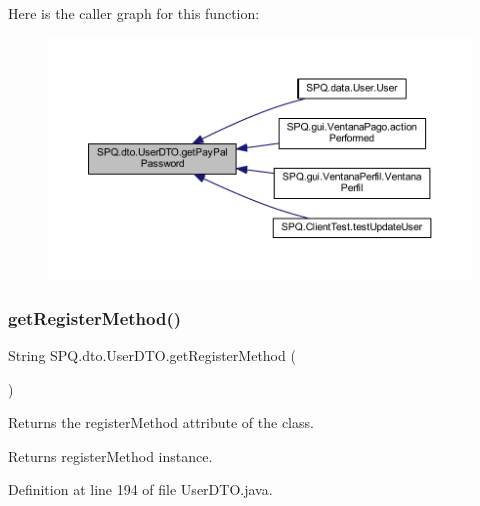 Here is the caller graph for this function\+:\nopagebreak
\begin{figure}[H]
\begin{center}
\leavevmode
\includegraphics[width=350pt]{class_s_p_q_1_1dto_1_1_user_d_t_o_ab024e5157674f9bc382edfda06c348ec_icgraph}
\end{center}
\end{figure}
\mbox{\label{class_s_p_q_1_1dto_1_1_user_d_t_o_ab2180112e27f967d77dd4696f88bd2ef}} 
\subsubsection{\texorpdfstring{get\+Register\+Method()}{getRegisterMethod()}}
{\footnotesize\ttfamily String S\+P\+Q.\+dto.\+User\+D\+T\+O.\+get\+Register\+Method (\begin{DoxyParamCaption}{ }\end{DoxyParamCaption})}

Returns the register\+Method attribute of the class. \begin{DoxyReturn}{Returns}
register\+Method instance. 
\end{DoxyReturn}


Definition at line 194 of file User\+D\+T\+O.\+java.

